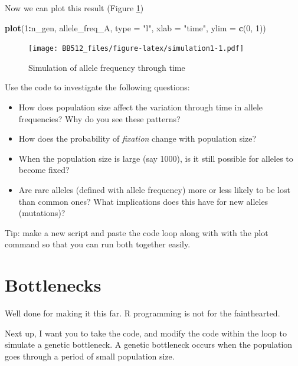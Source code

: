 \documentclass[
  a4paper]{book}
\newenvironment{Shaded}{\begin{snugshade}}{\end{snugshade}}
\newcommand{\AttributeTok}[1]{\textcolor[rgb]{0.13,0.29,0.53}{#1}}
\newcommand{\DecValTok}[1]{\textcolor[rgb]{0.00,0.00,0.81}{#1}}
\newcommand{\FunctionTok}[1]{\textcolor[rgb]{0.13,0.29,0.53}{\textbf{#1}}}
\newcommand{\NormalTok}[1]{#1}
\newcommand{\SpecialCharTok}[1]{\textcolor[rgb]{0.81,0.36,0.00}{\textbf{#1}}}
\newcommand{\StringTok}[1]{\textcolor[rgb]{0.31,0.60,0.02}{#1}}
\providecommand{\tightlist}{%
  \setlength{\itemsep}{0pt}\setlength{\parskip}{0pt}}
\begin{document}
Now we can plot this result (Figure \ref{fig:simulation1})

\begin{Shaded}
\begin{Highlighting}[]
\FunctionTok{plot}\NormalTok{(}\DecValTok{1}\SpecialCharTok{:}\NormalTok{n\_gen, allele\_freq\_A, }\AttributeTok{type =} \StringTok{"l"}\NormalTok{, }\AttributeTok{xlab =} \StringTok{"time"}\NormalTok{, }\AttributeTok{ylim =} \FunctionTok{c}\NormalTok{(}\DecValTok{0}\NormalTok{, }\DecValTok{1}\NormalTok{))}
\end{Highlighting}
\end{Shaded}

\begin{figure}
\centering
\texttt{[image: BB512\_files/figure-latex/simulation1-1.pdf]}
\caption{\label{fig:simulation1}Simulation of allele frequency through time}
\end{figure}

Use the code to investigate the following questions:

\begin{itemize}
\tightlist
\item
  How does population size affect the variation through time in allele frequencies? Why do you see these patterns?
\item
  How does the probability of \emph{fixation} change with population size?
\item
  When the population size is large (say 1000), is it still possible for alleles to become fixed?
\item
  Are rare alleles (defined with allele frequency) more or less likely to be lost than common ones? What implications does this have for new alleles (mutations)?
\end{itemize}

\begin{do-something}
Tip: make a new script and paste the code loop along with with the plot
command so that you can run both together easily.
\end{do-something}

\hypertarget{bottlenecks}{%
\section{Bottlenecks}\label{bottlenecks}}

Well done for making it this far. R programming is not for the fainthearted.

Next up, I want you to take the code, and modify the code within the loop to simulate a genetic bottleneck. A genetic bottleneck occurs when the population goes through a period of small population size.
\end{document}
